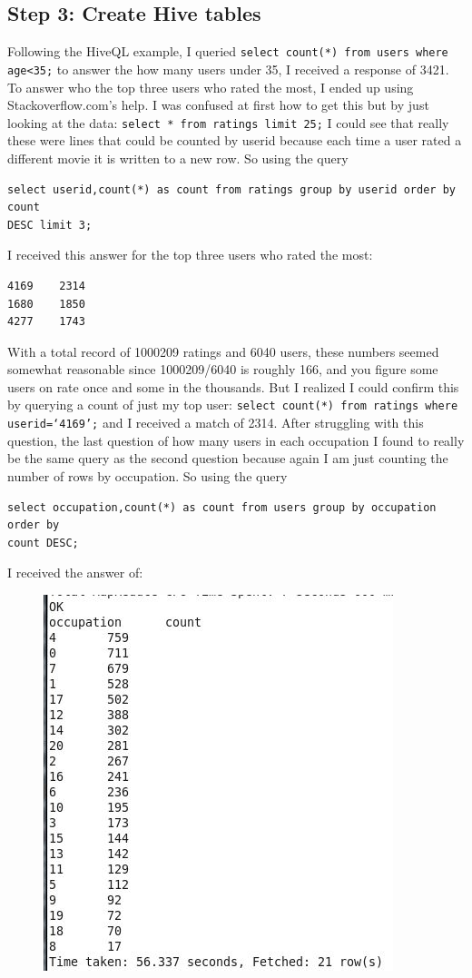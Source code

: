 \documentclass[10pt]{article}
\begin{document}
\subsection*{Step 3: Create Hive tables}
Following the HiveQL example, I queried \verb|select count(*) from users where age<35;| to answer the how many users under 35, I received a response of 3421. To answer who the top three users who rated the most, I ended up using Stackoverflow.com’s help. I was confused at first how to get this but by just looking at the data: \verb|select * from ratings limit 25;| I could see that really these were lines that could be counted by userid because each time a user rated a different movie it is written to a new row. So using the query 
\begin{verbatim}select userid,count(*) as count from ratings group by userid order by count
DESC limit 3;\end{verbatim}
I received this answer for the top three users who rated the most: 
\begin{verbatim}
4169    2314 
1680    1850 
4277    1743 
\end{verbatim}
With a total record of 1000209 ratings and 6040 users, these numbers seemed somewhat reasonable since 1000209/6040 is roughly 166, and you figure some users on rate once and some in the thousands. But I realized I could confirm this by querying a count of just my top user: \verb|select count(*) from ratings where userid=‘4169’;| and I received a match of 2314. After struggling with this question, the last question of how many users in each occupation I found to really be the same query as the second question because again I am just counting the number of rows by occupation. So using the query  
\begin{verbatim}
select occupation,count(*) as count from users group by occupation order by 
count DESC; 
\end{verbatim}
I received the answer of: 
\begin{figure}[!h]
\includegraphics[scale=0.5]{occupation_query.jpg}
\centering
\end{figure}
\end{document}
